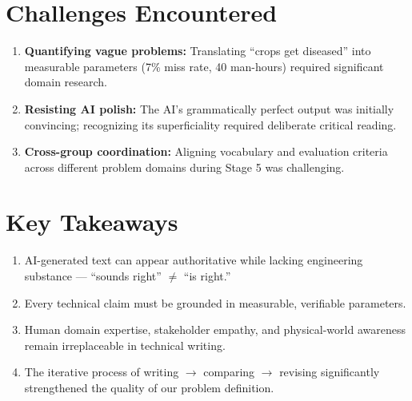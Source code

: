 \documentclass[11pt, a4paper]{article}
\begin{document}
\section{Challenges Encountered}

\begin{enumerate}[nosep]
    \item \textbf{Quantifying vague problems:} Translating ``crops get diseased'' into measurable parameters (7\% miss rate, 40 man-hours) required significant domain research.
    \item \textbf{Resisting AI polish:} The AI's grammatically perfect output was initially convincing; recognizing its superficiality required deliberate critical reading.
    \item \textbf{Cross-group coordination:} Aligning vocabulary and evaluation criteria across different problem domains during Stage 5 was challenging.
\end{enumerate}

\section{Key Takeaways}

\begin{enumerate}[nosep]
    \item AI-generated text can appear authoritative while lacking engineering substance --- ``sounds right'' $\neq$ ``is right.''
    \item Every technical claim must be grounded in measurable, verifiable parameters.
    \item Human domain expertise, stakeholder empathy, and physical-world awareness remain irreplaceable in technical writing.
    \item The iterative process of writing $\rightarrow$ comparing $\rightarrow$ revising significantly strengthened the quality of our problem definition.
\end{enumerate}
\end{document}

